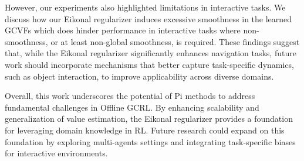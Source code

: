\documentclass{article}
\theoremstyle{plain}
\theoremstyle{definition}
\theoremstyle{remark}
\begin{document}
However, our experiments also highlighted limitations in interactive tasks. We discuss how our Eikonal regularizer induces excessive smoothness in the learned GCVFs which does hinder performance in interactive tasks where non-smoothness, or at least non-global smoothness, is required. These findings suggest that, while the Eikonal regularizer significantly enhances navigation tasks, future work should incorporate mechanisms that better capture task-specific dynamics, such as object interaction, to improve applicability across diverse domains.

Overall, this work underscores the potential of Pi methods to address fundamental challenges in Offline GCRL. By enhancing scalability and generalization of value estimation, the Eikonal regularizer provides a foundation for leveraging domain knowledge in RL. Future research could expand on this foundation by exploring multi-agents settings and integrating task-specific biases for interactive environments.




\clearpage

\newpage
\end{document}
